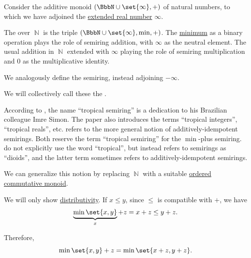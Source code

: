 \begin{definition}\label{def:tropical_semiring}
  Consider the additive monoid \( (\BbbN \cup \set{ \infty }, +) \) of natural numbers, to which we have adjoined the \hyperref[def:extended_real_numbers]{extended real number} \( \infty \).

  The  over \( \BbbN \) is the triple \( (\BbbN \cup \set{ \infty }, \min, +) \). The \hyperref[def:extremal_points/maximum_and_minimum]{minimum} as a binary operation plays the role of semiring addition, with \( \infty \) as the neutral element. The usual addition in \( \BbbN \) extended with \( \infty \) playing the role of semiring multiplication and \( 0 \) as the multiplicative identity.

  We analogously define the  semiring, instead adjoining \( -\infty \).

  We will collectively call these the .
\end{definition}
\begin{comments}
  \item According to \textcite{Pin1998TropicalSemirings}, the name \enquote{tropical semiring} is a dedication to his Brazilian colleague Imre Simon. The paper also introduces the terms \enquote{tropical integers}, \enquote{tropical reals}, etc. \Textcite[3]{Golan1999Semirings} refers to the more general notion of additively-idempotent semirings. Both reserve the term \enquote{tropical semiring} for the \( \min \)-plus semiring. \Textcite[ch. 3]{GondranMinoux1984GraphsAndAlgorithms} do not explicitly use the word \enquote{tropical}, but instead refers to semirings as \enquote{dioids}, and the latter term sometimes refers to additively-idempotent semirings.

  \item We can generalize this notion by replacing \( \BbbN \) with a suitable \hyperref[def:ordered_semigroup]{ordered} \hyperref[def:monoid/commutative]{commutative monoid}.
\end{comments}
\begin{defproof}
  We will only show \hyperref[eq:def:semiring/theory/axioms/distributivity/left]{distributivity}. If \( x \leq y \), since \( \leq \) is compatible with \( + \), we have
  \begin{equation*}
    \underbrace{\min\set{ x, y }}_{x} + z = x + z \leq y + z.
  \end{equation*}

  Therefore,
  \begin{equation*}
    \min\set{ x, y } + z = \min\set{ x + z , y + z }.
  \end{equation*}
\end{defproof}

